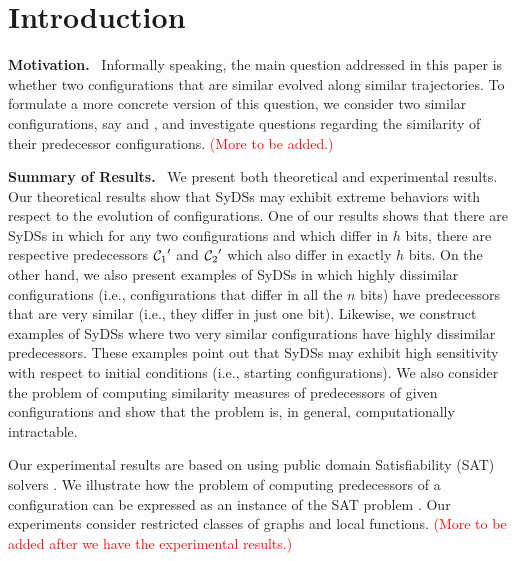 \section{Introduction}
\label{sec:intro}

\noindent
\textbf{Motivation.}~ 
Informally speaking,
the main question addressed in this paper is whether two configurations
that are similar evolved along similar trajectories.
To formulate a more concrete version of this question, we consider
two similar configurations, say \calcone{} and \calctwo, and
investigate questions regarding the similarity of their predecessor
configurations.
\textcolor{red}{(More to be added.)}

\smallskip

\noindent
\textbf{Summary of Results.}~ We present both theoretical and
experimental results.
Our theoretical results show that SyDSs may exhibit
extreme behaviors with respect to the evolution of configurations.
One of our results shows that there are SyDSs in which
for any two configurations \calcone{} and \calctwo{} 
which differ in $h$ bits, there are respective predecessors 
$\mbox{$\mathcal{C}_{1}$}'$ and $\mbox{$\mathcal{C}_{2}$}'$ which also differ in exactly $h$ bits.
On the other hand, we also present examples of SyDSs in which
highly dissimilar configurations (i.e., configurations that differ
in all the $n$ bits) have predecessors that are very similar (i.e., they
differ in just one bit).
Likewise, we construct examples of SyDSs where two very similar 
configurations have highly dissimilar predecessors.
These examples point out that SyDSs may exhibit high sensitivity
with respect to initial conditions (i.e., starting configurations).
We also consider the problem of computing similarity
measures of predecessors of given configurations and show that
the problem is, in general, computationally intractable.

Our experimental results are based on using public domain Satisfiability
(SAT) solvers \cite{sat-live}.
We illustrate how the problem of computing predecessors of a
configuration can be expressed as an instance of the SAT
problem \cite{GJ-1979}.
Our experiments consider restricted classes of graphs and local functions.
\textcolor{red}{(More to be added after we have the experimental results.)}



\smallskip

